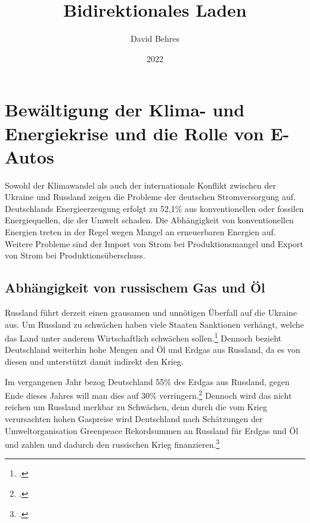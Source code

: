 \documentclass[12pt, ngerman]{article}
\begin{document}
\begin{titlepage}


    \title{Bidirektionales Laden}
    \author{David Behres}
    \date{2022}
    \maketitle

\end{titlepage}

\tableofcontents
\pagebreak


\section{Bewältigung der Klima- und Energiekrise und die Rolle von E-Autos}



Sowohl der Klimawandel als auch der internationale Konflikt zwischen der Ukraine und Russland
zeigen die Probleme der deutschen Stromversorgung auf.
Deutschlands Energieerzeugung erfolgt zu 52,1\% aus konventionellen oder fossilen Energiequellen, die der Umwelt
schaden.
Die Abhängigkeit von konventionellen Energien treten in der Regel wegen Mangel an erneuerbaren Energien auf.
Weitere Probleme sind der Import von Strom bei Produktionsmangel und Export von Strom bei Produktionsüberschuss.

\subsection{Abhängigkeit von russischem Gas und Öl} \label{subsec:putin}
Russland führt derzeit einen grausamen und unnötigen Überfall auf die Ukraine aus.
Um Russland zu schwächen haben viele Staaten Sanktionen verhängt, welche das Land unter anderem
Wirtschaftlich schwächen sollen.\footcite{SanktionenGegenRussland2022}
Dennoch bezieht Deutschland weiterhin hohe Mengen and Öl und Erdgas aus Russland, da es von diesen und
unterstützt damit indirekt den Krieg.



Im vergangenen Jahr bezog Deutschland 55\% des Erdgas aus Russland, gegen Ende dieses Jahres will man dies auf
30\% verringern.\footcite{wdraktuellFAQWasGasLieferstopp} Dennoch wird das nicht reichen um Russland merkbar zu
Schwächen, denn durch die vom Krieg verursachten hohen Gaspreise wird Deutschland nach Schätzungen der
Umweltorganisation Greenpeace Rekordsummen an Russland für Erdgas und Öl und zahlen und dadurch den russischen
Krieg finanzieren.\footcite{balserOelUndGas}
\end{document}
